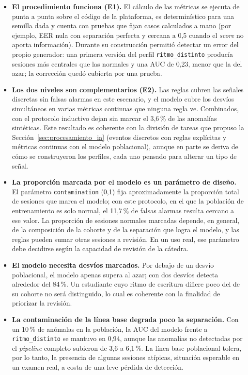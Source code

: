 \begin{itemize}
    \item \textbf{El procedimiento funciona (E1).} El cálculo de las métricas se ejecuta de punta a punta sobre el código de la plataforma, es determinístico para una semilla dada y cuenta con pruebas que fijan casos calculados a mano (por ejemplo, EER nula con separación perfecta y cercana a 0{,}5 cuando el \textit{score} no aporta información). Durante su construcción permitió detectar un error del propio generador: una primera versión del perfil \texttt{ritmo\_distinto} producía sesiones más centrales que las normales y una AUC de 0,23, menor que la del azar; la corrección quedó cubierta por una prueba.
    \item \textbf{Los dos niveles son complementarios (E2).} Las reglas cubren las señales discretas sin falsas alarmas en este escenario, y el modelo cubre los desvíos simultáneos en varias métricas continuas que ninguna regla ve. Combinados, con el protocolo inductivo dejan sin marcar el 3,6\,\% de las anomalías sintéticas. Este resultado es coherente con la división de tareas que propuso la Sección~\ref{sec:procesamiento_ia} (eventos discretos con reglas explícitas y métricas continuas con el modelo poblacional), aunque en parte se deriva de cómo se construyeron los perfiles, cada uno pensado para alterar un tipo de señal.
    \item \textbf{La proporción marcada por el modelo es un parámetro de diseño.} El parámetro \texttt{contamination} (0{,}1) fija aproximadamente la proporción total de sesiones que marca el modelo; con este protocolo, en el que la población de entrenamiento es solo normal, el 11,7\,\% de falsas alarmas resulta cercano a ese valor. La proporción de sesiones normales marcadas depende, en general, de la composición de la cohorte y de la separación que logra el modelo, y las reglas pueden sumar otras sesiones a revisión. En un uso real, ese parámetro debe decidirse según la capacidad de revisión de la cátedra.
    \item \textbf{El modelo necesita desvíos marcados.} Por debajo de un desvío poblacional, el modelo apenas supera al azar; con dos desvíos detecta alrededor del 84\,\%. Un estudiante cuyo ritmo de escritura difiere poco del de su cohorte no será distinguido, lo cual es coherente con la finalidad de priorizar la revisión.
    \item \textbf{La contaminación de la línea base degrada poco la separación.} Con un 10\,\% de anómalas en la población, la AUC del modelo frente a \texttt{ritmo\_distinto} se mantuvo en 0,94, aunque las anomalías no detectadas por el \textit{pipeline} completo subieron de 3,6 a 6,1\,\%. La línea base poblacional tolera, por lo tanto, la presencia de algunas sesiones atípicas, situación esperable en un examen real, a costa de una leve pérdida de detección.
\end{itemize}

